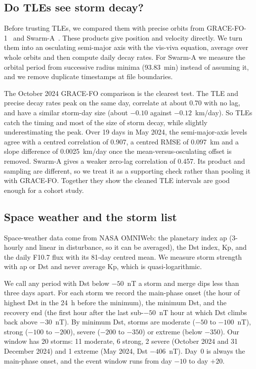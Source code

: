 \subsection{Do TLEs see storm decay?}
\label{sec:precise}

Before trusting TLEs, we compared them with precise orbits from GRACE-FO-1~\cite{landerer2020gracefo}
and Swarm-A~\cite{friis2006swarm}. These products give position and velocity directly. We turn
them into an osculating semi-major axis with the vis-viva equation, average over whole orbits and
then compute daily decay rates. For Swarm-A we measure the orbital period from successive radius
minima (93.83~min) instead of assuming it, and we remove duplicate timestamps at file boundaries.

The October 2024 GRACE-FO comparison is the clearest test. The TLE and precise decay rates peak
on the same day, correlate at about 0.70 with no lag, and have a similar storm-day size (about
$-0.10$ against $-0.12$~km/day). So TLEs catch the timing and most of the size of storm decay,
while slightly underestimating the peak. Over 19 days in May 2024, the semi-major-axis levels
agree with a centred correlation of 0.907, a centred RMSE of 0.097~km and a slope difference of
0.0025~km/day once the mean-versus-osculating offset is removed. Swarm-A gives a weaker
zero-lag correlation of 0.457. Its product and sampling are different, so we treat it as a
supporting check rather than pooling it with GRACE-FO. Together they show the cleaned TLE intervals are good enough for a cohort
study.

\subsection{Space weather and the storm list}
\label{sec:sw}

Space-weather data come from NASA OMNIWeb: the planetary index ap (3-hourly and linear in
disturbance, so it can be averaged), the Dst index, Kp, and the daily F10.7 flux with its 81-day
centred mean. We measure storm strength with ap or Dst and never average Kp, which is
quasi-logarithmic.

We call any period with Dst below $-50$~nT a storm and merge dips less than three days apart.
For each storm we record the main-phase onset (the hour of highest Dst in the 24~h before the
minimum), the minimum Dst, and the recovery end (the first hour after the last sub-$-50$~nT hour
at which Dst climbs back above $-30$~nT). By minimum Dst, storms are moderate ($-50$ to
$-100$~nT), strong ($-100$ to $-200$), severe ($-200$ to $-350$) or extreme (below $-350$). Our
window has 20 storms: 11 moderate, 6 strong, 2 severe (October 2024 and 31 December 2024) and 1
extreme (May 2024, Dst $-406$~nT). Day~0 is always the main-phase onset, and the event window
runs from day $-10$ to day $+20$.

